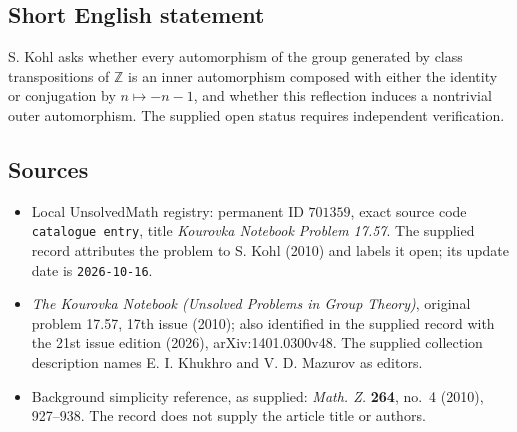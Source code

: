 \documentclass[11pt]{article}
\newcommand{\Z}{\mathbb{Z}}
\begin{document}
\subsection{Short English statement}
S. Kohl asks whether every automorphism of the group generated by class transpositions of \(\Z\) is an inner automorphism composed with either the identity or conjugation by \(n\mapsto -n-1\), and whether this reflection induces a nontrivial outer automorphism. The supplied open status requires independent verification.
\subsection{Sources}
\begin{itemize}
\item Local UnsolvedMath registry: permanent ID \(701359\), exact source code \texttt{catalogue entry}, title \emph{Kourovka Notebook Problem 17.57}. The supplied record attributes the problem to S. Kohl (2010) and labels it open; its update date is \texttt{2026-10-16}.
\item \emph{The Kourovka Notebook (Unsolved Problems in Group Theory)}, original problem 17.57, 17th issue (2010); also identified in the supplied record with the 21st issue edition (2026), arXiv:1401.0300v48. The supplied collection description names E. I. Khukhro and V. D. Mazurov as editors.
\item Background simplicity reference, as supplied: \emph{Math. Z.} \textbf{264}, no.~4 (2010), 927--938. The record does not supply the article title or authors.
\end{itemize}
\end{document}

